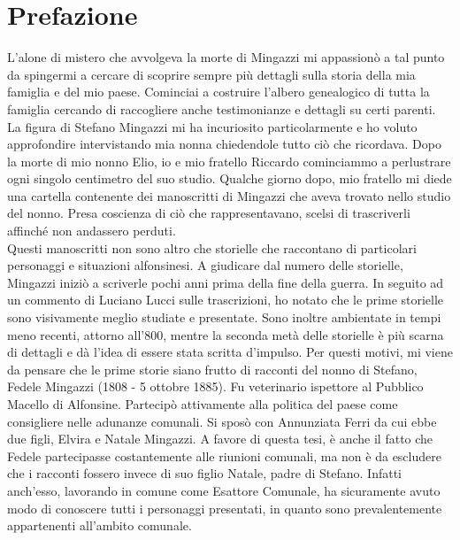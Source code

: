 \thispagestyle{empty}
\chapter*{Prefazione}
L'alone di mistero che avvolgeva la morte di Mingazzi mi appassionò a tal punto da spingermi a cercare di scoprire sempre più dettagli sulla storia della mia famiglia e del mio paese. Cominciai a costruire l'albero genealogico di tutta la famiglia cercando di raccogliere anche testimonianze e dettagli su certi parenti. La figura di Stefano Mingazzi mi ha incuriosito particolarmente e ho voluto approfondire intervistando mia nonna chiedendole tutto ciò che ricordava. Dopo la morte di mio nonno Elio, io e mio fratello Riccardo cominciammo a perlustrare ogni singolo centimetro del suo studio. Qualche giorno dopo, mio fratello mi diede una cartella contenente dei manoscritti di Mingazzi che aveva trovato nello studio del nonno. Presa coscienza di ciò che rappresentavano, scelsi di trascriverli affinché non andassero perduti.\\
\indent Questi manoscritti non sono altro che storielle che raccontano di particolari personaggi e situazioni alfonsinesi. A giudicare dal numero delle storielle, Mingazzi iniziò a scriverle pochi anni prima della fine della guerra. 
In seguito ad un commento di Luciano Lucci sulle trascrizioni, ho notato che le prime storielle sono visivamente meglio studiate e presentate. Sono inoltre ambientate in tempi meno recenti, attorno all'800, mentre la seconda metà delle storielle è più scarna di dettagli e dà l'idea di essere stata scritta d'impulso. Per questi motivi, mi viene da pensare che le prime storie siano frutto di racconti del nonno di Stefano, Fedele Mingazzi (1808 - 5 ottobre 1885). Fu veterinario ispettore al Pubblico Macello di Alfonsine. Partecipò attivamente alla politica del paese come consigliere nelle adunanze comunali. Si sposò con Annunziata Ferri da cui ebbe due figli, Elvira e Natale Mingazzi. A favore di questa tesi, è anche il fatto che Fedele partecipasse costantemente alle riunioni comunali, ma non è da escludere che i racconti fossero invece di suo figlio Natale, padre di Stefano. Infatti anch'esso, lavorando in comune come Esattore Comunale, ha sicuramente avuto modo di conoscere tutti i personaggi presentati, in quanto sono prevalentemente appartenenti all'ambito comunale.\\

